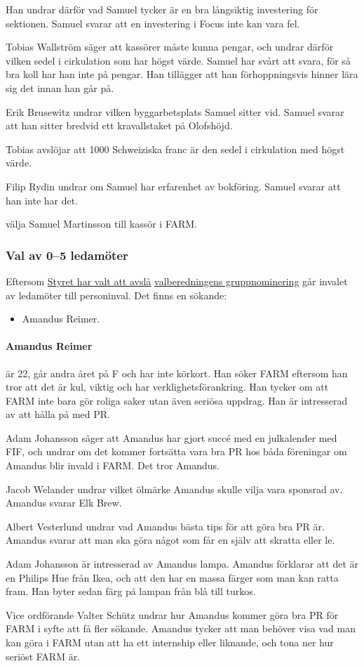 \documentclass[hidelinks]{sektionsmote}
\begin{document}
Han undrar därför vad Samuel tycker är en bra långsiktig investering för sektionen.
Samuel svarar att en investering i Focus inte kan vara fel.\par
Tobias Wallström säger att kassörer måste kunna pengar, och undrar därför vilken sedel i cirkulation som har högst värde.
Samuel har svårt att svara, för så bra koll har han inte på pengar.
Han tillägger att han förhoppningsvis hinner lära sig det innan han går på.\par
Erik Brusewitz undrar vilken byggarbetsplats Samuel sitter vid.
Samuel svarar att han sitter bredvid ett kravallstaket på Olofshöjd.\par
Tobias avslöjar att 1000 Schweiziska franc är den sedel i cirkulation med högst värde.\par
Filip Rydin undrar om Samuel har erfarenhet av bokföring.
Samuel svarar att han inte har det.

\begin{beslut}
  \item välja Samuel Martinsson till kassör i FARM.
\end{beslut}

\subsubsection{Val av 0--5 ledamöter}
Eftersom \hyperlink{bilagor/nomfarm-avslag.pdf.1}{Styret har valt att avslå} \hyperlink{bilagor/nomfarm.pdf.1}{valberedningens gruppnominering} går invalet av ledamöter till personinval.
Det finns en sökande:
\begin{itemize}
    \item Amandus Reimer.
\end{itemize}

\paragraph{Amandus Reimer} är 22, går andra året på F och har inte körkort.
Han söker FARM eftersom han tror att det är kul, viktig och har verklighetsförankring.
Han tycker om att FARM inte bara gör roliga saker utan även seriösa uppdrag.
Han är intresserad av att hålla på med PR.\par
Adam Johansson säger att Amandus har gjort succé med en julkalender med FIF, och undrar om det kommer fortsätta vara bra PR hos båda föreningar om Amandus blir invald i FARM.
Det tror Amandus.\par
Jacob Welander undrar vilket ölmärke Amandus skulle vilja vara sponsrad av.
Amandus svarar Elk Brew.\par
Albert Vesterlund undrar vad Amandus bästa tips för att göra bra PR är.
Amandus svarar att man ska göra något som får en själv att skratta eller le.\par
Adam Johansson är intresserad av Amandus lampa.
Amandus förklarar att det är en Philips Hue från Ikea, och att den har en massa färger som man kan ratta fram.
Han byter sedan färg på lampan från blå till turkos.\par
Vice ordförande Valter Schütz undrar hur Amandus kommer göra bra PR för FARM i syfte att få fler sökande.
Amandus tycker att man behöver visa vad man kan göra i FARM utan att ha ett internship eller liknande, och tona ner hur seriöst FARM är.
\end{document}
